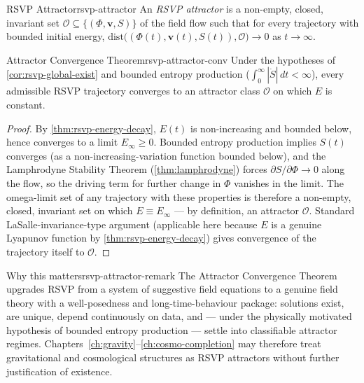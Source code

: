 \documentclass[12pt,twoside,openright]{book}
\begin{document}
\begin{definition}{RSVP Attractor}{rsvp-attractor}
  An \emph{RSVP attractor} is a non-empty, closed, invariant
  set $\mathcal{O}\subseteq\{(\Phi,\mathbf{v},S)\}$ of the
  field flow such that for every trajectory with bounded
  initial energy, $\mathrm{dist}\bigl((\Phi(t),\mathbf{v}(t),S(t)),\mathcal{O}\bigr)\to0$
  as $t\to\infty$.
\end{definition}

\begin{theorem}{Attractor Convergence Theorem}{rsvp-attractor-conv}
  Under the hypotheses of \cref{cor:rsvp-global-exist} and
  bounded entropy production
  ($\int_0^\infty |\dot S|\,dt < \infty$), every admissible
  RSVP trajectory converges to an attractor class
  $\mathcal{O}$ on which $E$ is constant.
\end{theorem}

\begin{proof}
  By \cref{thm:rsvp-energy-decay}, $E(t)$ is non-increasing
  and bounded below, hence converges to a limit
  $E_\infty \ge 0$. Bounded entropy production implies $S(t)$
  converges (as a non-increasing-variation function bounded
  below), and the Lamphrodyne Stability Theorem
  (\cref{thm:lamphrodyne}) forces
  $\partial S/\partial\Phi \to 0$ along the flow, so the
  driving term for further change in $\Phi$ vanishes in the
  limit. The omega-limit set of any trajectory with these
  properties is therefore a non-empty, closed, invariant set
  on which $E \equiv E_\infty$ --- by definition, an
  attractor $\mathcal{O}$. Standard LaSalle-invariance-type
  argument (applicable here because $E$ is a genuine
  Lyapunov function by \cref{thm:rsvp-energy-decay}) gives
  convergence of the trajectory itself to $\mathcal{O}$.
\end{proof}

\begin{remark}{Why this matters}{rsvp-attractor-remark}
  The Attractor Convergence Theorem upgrades RSVP from a
  system of suggestive field equations to a genuine field
  theory with a well-posedness and long-time-behaviour
  package: solutions exist, are unique, depend continuously
  on data, and --- under the physically motivated hypothesis
  of bounded entropy production --- settle into classifiable
  attractor regimes. Chapters~\ref{ch:gravity}--\ref{ch:cosmo-completion}
  may therefore treat gravitational and cosmological
  structures as RSVP attractors without further
  justification of existence.
\end{remark}
\end{document}
